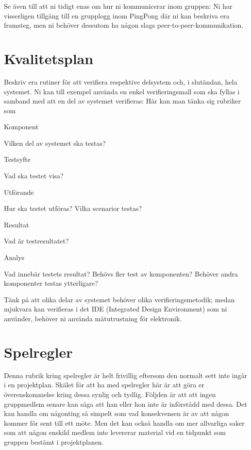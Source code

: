\documentclass[a4paper]{article}
\begin{document}
Se även till att ni tidigt enas om hur ni kommunicerar inom gruppen:
Ni har visserligen tillgång till en grupplogg inom PingPong där ni kan
beskriva era framsteg, men ni behöver dessutom ha någon slags
peer-to-peer-kommunikation.



\section{Kvalitetsplan}


Beskriv era rutiner för att verifiera respektive delsystem och, i
slutändan, hela systemet. Ni kan till exempel använda en enkel
verifieringsmall som ska fyllas i samband med att en del av systemet
verifieras: Här kan man tänka sig rubriker som

Komponent

    Vilken del av systemet ska testas?

Testsyfte

    Vad ska testet visa?

Utförande

    Hur ska testet utföras? Vilka scenarior testas?

Resultat

    Vad är testresultatet?

Analys

    Vad innebär testets resultat? Behövs fler test av komponenten?
    Behöver andra komponenter testas ytterligare?

Tänk på att olika delar av systemet behöver olika verifieringsmetodik;
medan mjukvara kan verifieras i det IDE (Integrated Design Environment)
som ni använder, behöver ni använda mätutrustning för elektronik.



\section{Spelregler}


Denna rubrik kring spelregler är helt frivillig eftersom den normalt
sett inte ingår i en projektplan. Skälet för att ha med spelregler här
är att göra er överenskommelse kring dessa synlig och tydlig. Följden är
att att ingen gruppmedlem senare kan säga att han eller hon inte är
införstådd med dessa. Det kan handla om någonting så simpelt som vad
konsekvensen är av att någon kommer för sent till ett möte. Men det kan
också handla om mer allvarliga saker som att någon enskild medlem inte
levererar material vid en tidpunkt som gruppen bestämt i projektplanen.
\end{document}
